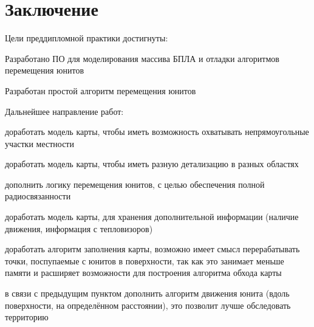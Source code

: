 \newpage
\section{Заключение}

Цели преддипломной практики достигнуты:
\begin{mintemize}

\item Разработано ПО для моделирования массива БПЛА
      и отладки алгоритмов перемещения юнитов

\item Разработан простой алгоритм перемещения юнитов
\end{mintemize}

Дальнейшее направление работ:
\begin{mintemize}
    \item доработать модель карты, чтобы иметь возможность охватывать непрямоугольные участки местности
    \item доработать модель карты, чтобы иметь разную детализацию в разных областях
    \item дополнить логику перемещения юнитов, с целью обеспечения полной радиосвязанности
    \item доработать модель карты, для хранения дополнительной информации (наличие движения, информация с тепловизоров)
    \item доработать алгоритм заполнения карты, возможно имеет смысл перерабатывать точки, поспупаемые с юнитов в 
            поверхности, так как это занимает меньше памяти и расширяет возможности для построения алгоритма обхода карты
    \item в связи с предыдущим пунктом дополнить алгоритм движения юнита (вдоль поверхности, на определённом расстоянии),
            это позволит лучше обследовать территорию
\end{mintemize}
